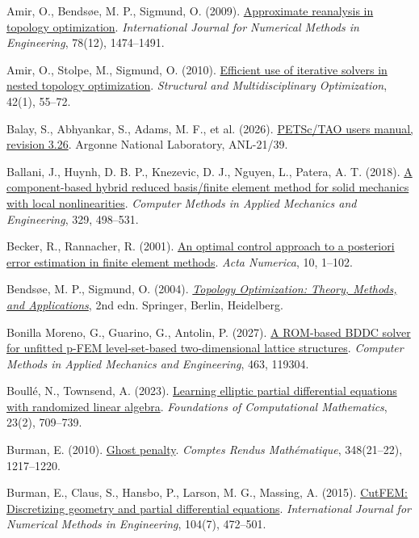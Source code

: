 \documentclass[preprint,12pt,authoryear]{elsarticle}
\begin{document}
Amir, O., Bendsøe, M. P., Sigmund, O. (2009). \href{https://doi.org/10.1002/nme.2536}{Approximate reanalysis in topology optimization}. \emph{International Journal for Numerical Methods in Engineering}, 78(12), 1474--1491.

Amir, O., Stolpe, M., Sigmund, O. (2010). \href{https://doi.org/10.1007/s00158-009-0463-4}{Efficient use of iterative solvers in nested topology optimization}. \emph{Structural and Multidisciplinary Optimization}, 42(1), 55--72.

Balay, S., Abhyankar, S., Adams, M. F., et al. (2026). \href{https://petsc.org/release/manual/}{PETSc/TAO users manual, revision 3.26}. Argonne National Laboratory, ANL-21/39.

Ballani, J., Huynh, D. B. P., Knezevic, D. J., Nguyen, L., Patera, A. T. (2018). \href{https://doi.org/10.1016/j.cma.2017.09.014}{A component-based hybrid reduced basis/finite element method for solid mechanics with local nonlinearities}. \emph{Computer Methods in Applied Mechanics and Engineering}, 329, 498--531.

Becker, R., Rannacher, R. (2001). \href{https://doi.org/10.1017/S0962492901000010}{An optimal control approach to a posteriori error estimation in finite element methods}. \emph{Acta Numerica}, 10, 1--102.

Bendsøe, M. P., Sigmund, O. (2004). \href{https://doi.org/10.1007/978-3-662-05086-6}{\emph{Topology Optimization: Theory, Methods, and Applications}}, 2nd edn. Springer, Berlin, Heidelberg.

Bonilla Moreno, G., Guarino, G., Antolin, P. (2027). \href{https://doi.org/10.1016/j.cma.2026.119304}{A ROM-based BDDC solver for unfitted p-FEM level-set-based two-dimensional lattice structures}. \emph{Computer Methods in Applied Mechanics and Engineering}, 463, 119304.

Boullé, N., Townsend, A. (2023). \href{https://doi.org/10.1007/s10208-022-09556-w}{Learning elliptic partial differential equations with randomized linear algebra}. \emph{Foundations of Computational Mathematics}, 23(2), 709--739.

Burman, E. (2010). \href{https://doi.org/10.1016/j.crma.2010.10.006}{Ghost penalty}. \emph{Comptes Rendus Mathématique}, 348(21--22), 1217--1220.

Burman, E., Claus, S., Hansbo, P., Larson, M. G., Massing, A. (2015). \href{https://doi.org/10.1002/nme.4823}{CutFEM: Discretizing geometry and partial differential equations}. \emph{International Journal for Numerical Methods in Engineering}, 104(7), 472--501.
\end{document}
